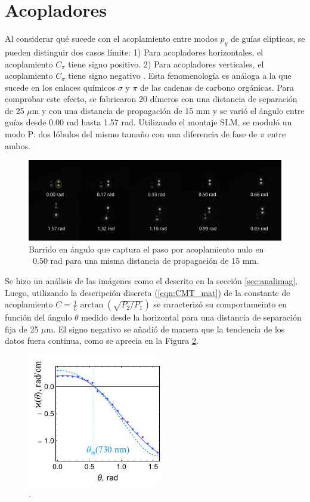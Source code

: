 \section{Acopladores}
Al considerar qué sucede con el acoplamiento entre modos $p_y$ de guías elípticas, se pueden distinguir dos casos límite: 1) Para acopladores horizontales, el acoplamiento $C_\pi$ tiene signo positivo. 2) Para acopladores verticales, el acoplamiento $C_\sigma$ tiene signo negativo \cite{Pmodecoupling}. Esta fenomenología es análoga a la que sucede en los enlaces químicos $\sigma$ y $\pi$ de las cadenas de carbono orgánicas. Para comprobar este efecto, se fabricaron 20 dímeros con una distancia de separación de 25 $\mu$m y con una distancia de propagación de 15 mm y se varió el ángulo entre guías desde 0.00 rad hasta 1.57 rad. Utilizando el montaje SLM, se moduló un modo P: dos lóbulos del mismo tamaño con una diferencia de fase de $\pi$ entre ambos.
\begin{figure}[H]
	\centering
	\includegraphics[trim={0 2cm 0 4cm},clip, width=\linewidth]{media/26um_15mm_angles.png}
	\caption{Barrido en ángulo que captura el paso por acoplamiento nulo en ~0.50 rad para una misma distancia de propagación de 15 mm. \label{fig:angulobarrido}}
\end{figure}
Se hizo un análisis de las imágenes como el descrito en la sección \ref{sec:analimag}. Luego, utilizando la descripción discreta (\ref{eqn:CMT_mat}) de la constante de acoplamiento $C = \frac{1}{L}\arctan\left(\sqrt{P_2/P_1}\right)$ se caracterizó su comportameinto en función del ángulo $\theta$ medido desde la horizontal para una distancia de separación fija de 25 $\mu$m. El signo negativo se añadió de manera que la tendencia de los datos fuera continua, como se aprecia en la Figura \ref{fig:coupangle}.
\begin{figure}[H]
\centering
	\includegraphics[width=0.5\linewidth]{media/couplingvsangle.jpg}
	\caption{.\label{fig:coupangle}}
\end{figure}
